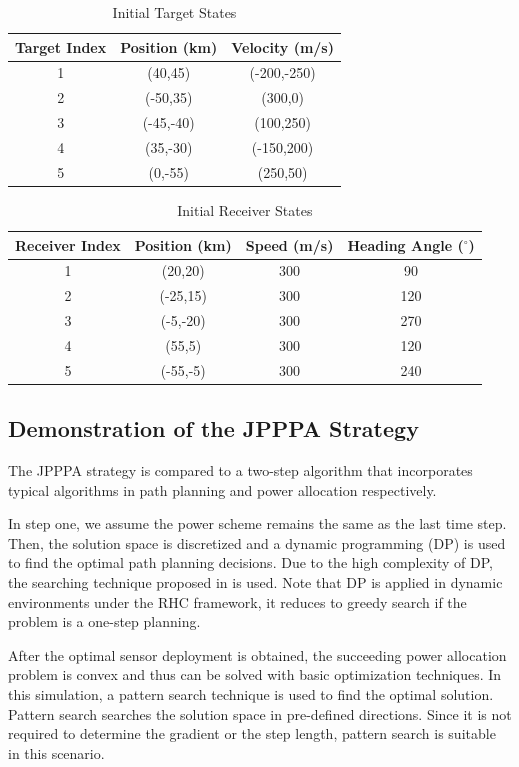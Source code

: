 \documentclass[12pt,journal,draftclsnofoot,onecolumn]{IEEEtran}
\begin{document}
 \begin{table}
	\centering
	\caption{Initial Target States}
	\begin{tabular}{ccc}
		\toprule
		Target Index & Position (km) & Velocity (m/s)\\ \midrule
		1 & (40,45) & (-200,-250)\\ 
		2 & (-50,35) & (300,0)\\ 
		3 & (-45,-40) & (100,250)\\ 
		4 & (35,-30) & (-150,200)\\ 
		5 & (0,-55) & (250,50)\\ 
		\bottomrule
	\end{tabular}
\label{tab:Target State}
\end{table} 

 \begin{table}[H]
	\centering
	\caption{Initial Receiver States}
	\begin{tabular}{cccc}
		\toprule
		Receiver Index & Position (km) & Speed (m/s) & Heading Angle ($^\circ$)\\ \midrule
		1 & (20,20) & 300 & 90\\ 
		2 & (-25,15) & 300 & 120\\ 
		3 & (-5,-20) & 300 & 270\\ 
		4 & (55,5) & 300 & 120\\ 
		5 & (-55,-5) & 300 & 240\\ 
		\bottomrule
	\end{tabular}
\label{tab:Receiver State}
\end{table}

\subsection{Demonstration of the JPPPA Strategy}
The JPPPA strategy is compared to a two-step algorithm that incorporates typical algorithms in path planning\cite{hernandez2004optimal} and power allocation\cite{yan2016joint} respectively.

In step one, we assume the power scheme remains the same as the last time step. Then, the solution space is discretized and a dynamic programming (DP) is used to find the optimal path planning decisions. Due to the high complexity of DP, the searching technique proposed in \cite{hernandez2004optimal} is used. Note that DP is applied in dynamic environments under the RHC framework, it reduces to greedy search if the problem is a one-step planning.

After the optimal sensor deployment is obtained, the succeeding power allocation problem is convex\cite{boyd2004convex} and thus can be solved with basic optimization techniques. In this simulation, a pattern search technique\cite{koohifar2016receding} is used to find the optimal solution. Pattern search searches the solution space in pre-defined directions. Since it is not required to determine the gradient or the step length, pattern search is suitable in this scenario.
\end{document}
